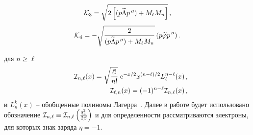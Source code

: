 \begin{equation}
	\label{eq:K3}
	{\cal K}_{3} = \sqrt{2\left [(p\widetilde \Lambda p^{\, \prime \prime}) + 
		M_\ell M_{n} \right]} \, ,  
\end{equation}
%
\begin{equation}
	\label{eq:K4}
	{\cal K}_4 = 
	- \sqrt{\frac{2}{(p\widetilde \Lambda p^{\, \prime \prime}) + M_\ell M_{n}}}\, 
	(p\widetilde \varphi p^{\, \prime \prime}) \, .
\end{equation}

для $n \geqslant \ell$
%
\begin{eqnarray}
	\nonumber
	&&{\cal I}_{n, \ell} (x) = \sqrt{\frac{\ell !}{n !}} \; \mathrm{e}^{-x/2} x^{(n-\ell)/2} L_\ell^{n-\ell} (x) \, ,
	\\
	&&{\cal I}_{\ell, n} (x) = (-1)^{n-\ell} {\cal I}_{n, \ell} (x) \, ,
	\label{eq:Inl}
\end{eqnarray}
\noindent и $L^k_n (x)$ -- обобщенные полиномы Лагерра~\cite{Gradstein:1963}.
Далее в работе будет использовано обозначение ${\cal I}_{n, \ell}\equiv{\cal I}_{n, \ell} \left(\frac{q_\perp^2}{2\beta}\right)$ и для определенности рассматриваются электроны, для которых знак заряда $\eta=-1$.

